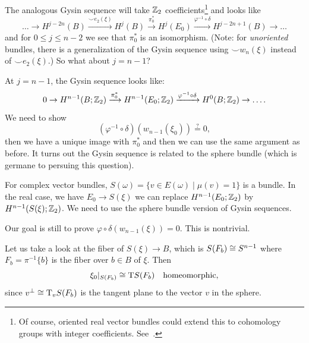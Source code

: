 \begin{node}
The analogous Gysin sequence will take $\mathbb{Z}_{2}$
coefficients\footnote{Of course, oriented real vector bundles could
extend this to cohomology groups with integer coefficients. See~\cite[Ch~17~Thm~7.4]{husemoller1993fibre}.} and
looks like
\begin{equation}
\dots\to H^{j-2n}(B)\xrightarrow{\smile e_{2}(\xi)}H^{j}(B)\xrightarrow{\pi_{0}^{*}}H^{j}(E_{0})\xrightarrow{\varphi^{-1}\circ\delta}H^{j-2n+1}(B)\to\dots
\end{equation}
and for $0\leq j\leq n-2$ we see that $\pi_{0}^{*}$ is an isomorphism.
(Note: for \emph{unoriented} bundles, there is a generalization of the
Gysin sequence using $\smile w_{n}(\xi)$ instead of $\smile e_{2}(\xi)$.)
So what about $j=n-1$?

At $j=n-1$, the Gysin sequence looks like:
\begin{equation}
0\to H^{n-1}(B;\mathbb{Z}_{2})\xrightarrow{\pi_{0}^{*}}H^{n-1}(E_{0};\mathbb{Z}_{2})\xrightarrow{\varphi^{-1}\circ\delta}H^{0}(B;\mathbb{Z}_{2})\to\dots.
\end{equation}
We need to show
\begin{equation}
(\varphi^{-1}\circ\delta)(w_{n-1}(\xi_{0}))\stackrel{?}{=}0,
\end{equation}
then we have a unique image with $\pi_{0}^{*}$ and then we can use the same
argument as before. It turns out the Gysin sequence is related to the
sphere bundle (which is germane to persuing this question).
\end{node}

\begin{node}
For complex vector bundles, $S(\omega)=\{v\in E(\omega)\mid\mu(v)=1\}$
is a bundle. In the real case, we have $E_{0}\to S(\xi)$ we can
replace $H^{n-1}(E_{0};\mathbb{Z}_{2})$ by $H^{n-1}(S(\xi);\mathbb{Z}_{2})$. We need
to use the sphere bundle version of Gysin sequences.
\end{node}

\begin{recall}
Our goal is still to prove $\varphi\circ\delta(w_{n-1}(\xi))=0$.
This is nontrivial.
\end{recall}

\begin{node}
Let us take a look at the fiber of $S(\xi)\to B$, which is
$S(F_{b})\cong S^{n-1}$ where $F_{b}=\pi^{-1}\{b\}$ is the fiber
over $b\in B$ of $\xi$. Then
\begin{equation}
\xi_{0}|_{S(F_{b})}\cong\mathrm{T} S(F_{b})\quad\mbox{homeomorphic},
\end{equation}
since $v^{\perp}\cong\mathrm{T}_{v}S(F_{b})$ is the tangent plane to the vector
$v$ in the sphere.
\end{node}

